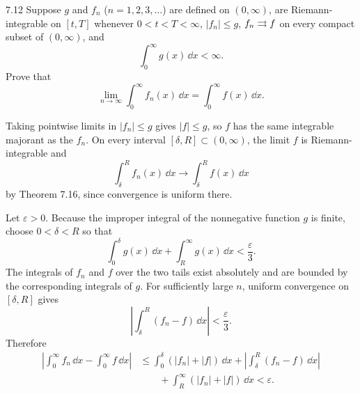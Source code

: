 \documentclass[11pt, oneside]{article}
\begin{document}
\begin{exercise}{7.12}
Suppose $g$ and $f_n$ ($n=1, 2, 3, \ldots$) are defined on $(0, \infty)$, are Riemann-integrable on $[t, T]$ whenever $0<t<T<\infty$, $|f_n|\le g$, $f_n\rightrightarrows f$ on every compact subset of $(0, \infty)$, and
\[
 \int_0^{\infty}g(x)\,\dd x<\infty.
\]
Prove that
\[
 \lim_{n\to\infty}\int_0^{\infty}f_n(x)\,\dd x
 =\int_0^{\infty}f(x)\,\dd x.
\]
\end{exercise}
\begin{solution}
Taking pointwise limits in $|f_n|\le g$ gives $|f|\le g$, so $f$ has the same integrable majorant as the $f_n$. On every interval $[\delta, R]\subset(0, \infty)$, the limit $f$ is Riemann-integrable and
\[
 \int_\delta^R f_n(x)\,\dd x\longrightarrow\int_\delta^R f(x)\,\dd x
\]
by Theorem 7.16, since convergence is uniform there.

Let $\varepsilon>0$. Because the improper integral of the nonnegative function $g$ is finite, choose $0<\delta<R$ so that
\[
 \int_0^\delta g(x)\,\dd x+\int_R^\infty g(x)\,\dd x<\frac\varepsilon3.
\]
The integrals of $f_n$ and $f$ over the two tails exist absolutely and are bounded by the corresponding integrals of $g$. For sufficiently large $n$, uniform convergence on $[\delta, R]$ gives
\[
 \left|\int_\delta^R(f_n-f)\,\dd x\right|<\frac\varepsilon3.
\]
Therefore
\[
 \begin{aligned}
 \left|\int_0^\infty f_n\,\dd x-\int_0^\infty f\,\dd x\right|
 &\le\int_0^\delta(|f_n|+|f|)\,\dd x
 +\left|\int_\delta^R(f_n-f)\,\dd x\right|\\
 &\qquad+\int_R^\infty(|f_n|+|f|)\,\dd x
 <\varepsilon.
 \end{aligned}
\]
\end{solution}
\end{document}
